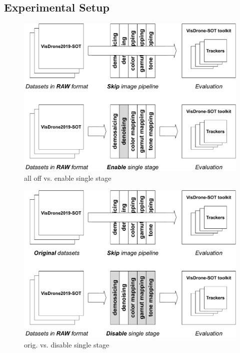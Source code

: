 \documentclass{beamer}
\begin{document}
\subsection{Experimental Setup}

\begin{frame}
    \begin{figure}[htpb]
        \begin{center}
            \includegraphics[width=0.8\linewidth]{fig/eva.pdf}
            \caption{all off vs. enable single stage}
        \end{center}
    \end{figure}
\end{frame}

\begin{frame}
    \begin{figure}[htpb]
        \begin{center}
            \includegraphics[width=0.8\linewidth]{fig/eva2.pdf}
            \caption{orig. vs. disable single stage}
        \end{center}
    \end{figure}
\end{frame}
\end{document}
